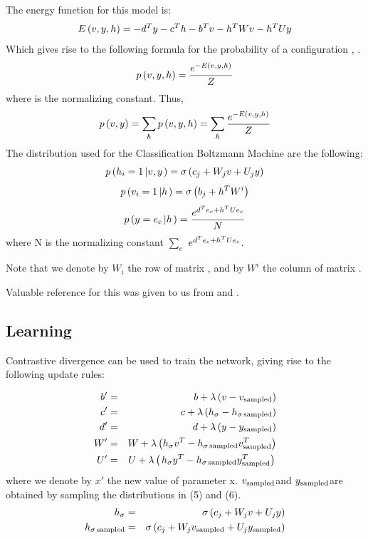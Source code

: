 The energy function for this model is:
\[ E \left( v , y, h \right) = - d^T y - c^T h - b^T v - h^T W v - h^T
   U y \]
Which gives rise to the following formula for the probability of a configuration
, .
\[ p \left( v, y, h \right) = \frac{e^{- E \left( v , y, h
   \right)}}{Z} \]
where  is the normalizing constant. Thus,
\[ p \left( v, y \right) = \sum_h p \left( v, y, h \right) = \sum_h \frac{e^{-
   E \left( v , y, h \right)}}{Z} \]
The distribution used for the Classification Boltzmann Machine are the
following:
\begin{equation}
  p \left( h_i = 1 \left| v, y \right. \right) = \sigma \left( c_j + 
   W_j v  + U_j y \right)
\end{equation}
\begin{equation}
  p \left( v_i = 1 \left| h \right. \right) = \sigma \left( b_j + 
   h^T W^i  \right)
\end{equation}
\begin{equation}
  p \left( y = e_c \left| h \right. \right) = \frac{e^{d^T e_c  + h^T
  Ue_c}}{N}
\end{equation}
where N is the normalizing constant $\sum_c$ $e^{d^T e_c  + h^T Ue_c}$.

Note that we denote by $W_i$ the row  of matrix , and
by $W^i_{}$ the column  of matrix .



Valuable reference for this was given to us from
\cite{louradour2011classification} and
\cite{larochelle2008classification}.

\subsection{Learning}

Contrastive divergence can be used to train the network, giving rise to the
following update rules:


\begin{eqnarray*}
  b'  & = & b + \lambda \left( v - v_{\operatorname{sampled}} \right)\\
  c'  & = & c + \lambda \left( h_{\sigma} - h_{\sigma \operatorname{sampled}}
  \right)\\
  d'  & = & d + \lambda \left( y - y_{\operatorname{sampled}} \right)\\
  W'  & = & W + \lambda \left( h_{\sigma} v^T - h_{\sigma \operatorname{sampled}}
  v_{\operatorname{sampled}}^T \right)\\
  U' & = & U + \lambda \left( \left. h_{\sigma} y^T - h_{\sigma
  \operatorname{sampled}} y_{\operatorname{sampled}}^T \right) \right.
\end{eqnarray*}
where we denote by $x'$ the new value of parameter x. $v_{\operatorname{sampled}} $and
$y_{\operatorname{sampled}} $are obtained by sampling the distributions in (5) and
(6).
\begin{eqnarray*}
  h_{\sigma} & = & \sigma \left( c_j +   W_j v  + U_j y
  \right)\\
  h_{\sigma \operatorname{sampled}} & = & \sigma \left( c_j +   W_j
  v_{\operatorname{sampled}}  + U_j y_{\operatorname{sampled}}  \right)
\end{eqnarray*}
